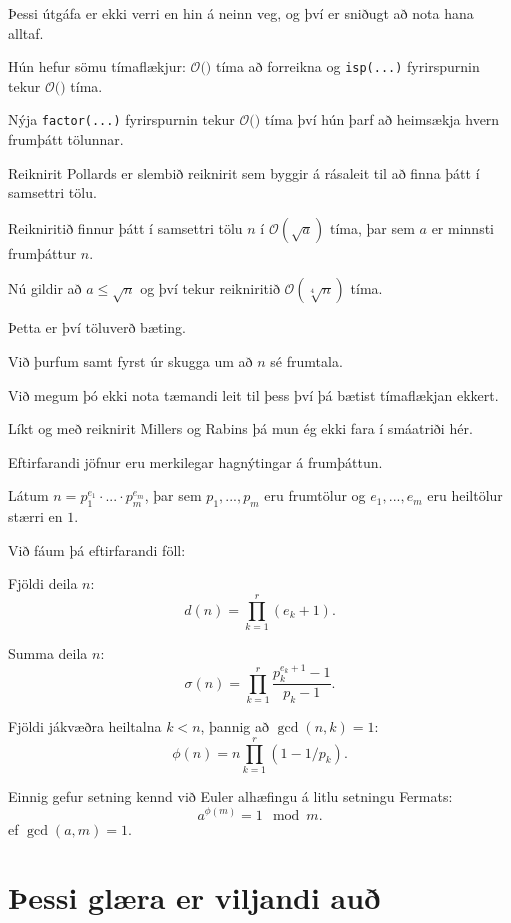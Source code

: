 {
}

{
    {
        \item<1-> Þessi útgáfa er ekki verri en hin á neinn veg, og því er sniðugt að nota hana alltaf.
        \item<2-> Hún hefur sömu tímaflækjur: $\mathcal{O}($$)$ tíma að forreikna 
            og \texttt{isp(...)} fyrirspurnin tekur $\mathcal{O}($$)$ tíma.
        \item<5-> Nýja \texttt{factor(...)} fyrirspurnin tekur $\mathcal{O}($$)$
            tíma því hún þarf að heimsækja hvern frumþátt tölunnar.
    }
}

{
    {
        \item<1-> Reiknirit Pollards er slembið reiknirit sem byggir á rásaleit til að finna þátt í samsettri tölu.
        \item<2-> Reikniritið finnur þátt í samsettri tölu $n$ í $\mathcal{O}(\sqrt{a})$ tíma, þar sem $a$ er minnsti frumþáttur $n$.
        \item<3-> Nú gildir að $a \leq \sqrt{n}$ og því tekur reikniritið $\mathcal{O}(\sqrt[4]{n})$ tíma.
        \item<4-> Þetta er því töluverð bæting.
        \item<5-> Við þurfum samt fyrst úr skugga um að $n$ sé frumtala.
        \item<6-> Við megum þó ekki nota tæmandi leit til þess því þá bætist tímaflækjan ekkert.
        \item<7-> Líkt og með reiknirit Millers og Rabins þá mun ég ekki fara í smáatriði hér.
    }
}

{
}

{
    {
        \item<1-> Eftirfarandi jöfnur eru merkilegar hagnýtingar á frumþáttun.
        \item<2-> Látum $n = p_1^{e_1} \cdot ... \cdot p_m^{e_m}$, þar sem $p_1, ..., p_m$ eru frumtölur og $e_1, ..., e_m$ eru heiltölur stærri en $1$.
        \item<3-> Við fáum þá eftirfarandi föll:
        {
            \item<4-> Fjöldi deila $n$:
            \[
                d(n) = \prod_{k = 1}^r (e_k + 1).
            \]
            \item<5-> Summa deila $n$:
            \[
                \sigma(n) = \prod_{k = 1}^r \frac{p_k^{e_k + 1} - 1}{p_k - 1}.
            \]
            \item<6-> Fjöldi jákvæðra heiltalna $k < n$, þannig að $\gcd(n, k) = 1$:
            \[
                \phi(n) = n\prod_{k = 1}^r (1 - 1/p_k).
            \]
        }
        \item<7-> Einnig gefur setning kennd við Euler alhæfingu á litlu setningu Fermats:
        \[
            a^{\phi(m)} = 1 \mod m.
        \]
            ef $\gcd(a, m) = 1$.
    }
}

\section{Þessi glæra er viljandi auð}
{
}


